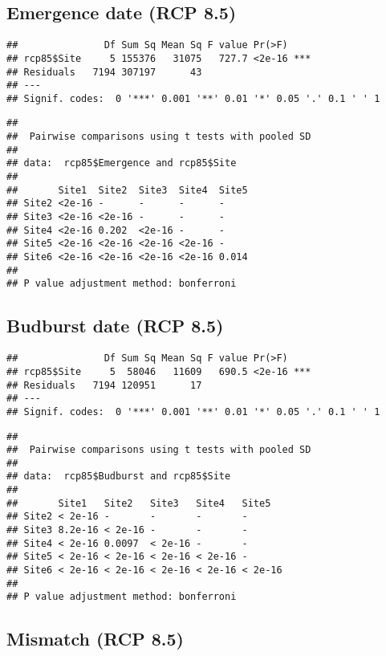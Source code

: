 \documentclass[
]{article}
\begin{document}
\hypertarget{emergence-date-rcp-8.5}{%
\subsection{Emergence date (RCP 8.5)}\label{emergence-date-rcp-8.5}}

\begin{verbatim}
##               Df Sum Sq Mean Sq F value Pr(>F)    
## rcp85$Site     5 155376   31075   727.7 <2e-16 ***
## Residuals   7194 307197      43                   
## ---
## Signif. codes:  0 '***' 0.001 '**' 0.01 '*' 0.05 '.' 0.1 ' ' 1
\end{verbatim}

\begin{verbatim}
## 
##  Pairwise comparisons using t tests with pooled SD 
## 
## data:  rcp85$Emergence and rcp85$Site 
## 
##       Site1  Site2  Site3  Site4  Site5
## Site2 <2e-16 -      -      -      -    
## Site3 <2e-16 <2e-16 -      -      -    
## Site4 <2e-16 0.202  <2e-16 -      -    
## Site5 <2e-16 <2e-16 <2e-16 <2e-16 -    
## Site6 <2e-16 <2e-16 <2e-16 <2e-16 0.014
## 
## P value adjustment method: bonferroni
\end{verbatim}

\hypertarget{budburst-date-rcp-8.5}{%
\subsection{Budburst date (RCP 8.5)}\label{budburst-date-rcp-8.5}}

\begin{verbatim}
##               Df Sum Sq Mean Sq F value Pr(>F)    
## rcp85$Site     5  58046   11609   690.5 <2e-16 ***
## Residuals   7194 120951      17                   
## ---
## Signif. codes:  0 '***' 0.001 '**' 0.01 '*' 0.05 '.' 0.1 ' ' 1
\end{verbatim}

\begin{verbatim}
## 
##  Pairwise comparisons using t tests with pooled SD 
## 
## data:  rcp85$Budburst and rcp85$Site 
## 
##       Site1   Site2   Site3   Site4   Site5  
## Site2 < 2e-16 -       -       -       -      
## Site3 8.2e-16 < 2e-16 -       -       -      
## Site4 < 2e-16 0.0097  < 2e-16 -       -      
## Site5 < 2e-16 < 2e-16 < 2e-16 < 2e-16 -      
## Site6 < 2e-16 < 2e-16 < 2e-16 < 2e-16 < 2e-16
## 
## P value adjustment method: bonferroni
\end{verbatim}

\hypertarget{mismatch-rcp-8.5}{%
\subsection{Mismatch (RCP 8.5)}\label{mismatch-rcp-8.5}}
\end{document}
